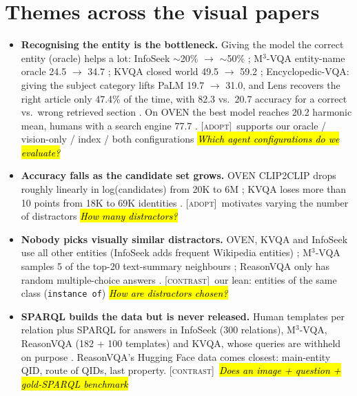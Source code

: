 \documentclass[10pt,a4paper]{article}
\newcommand{\adopt}{\textsc{[adopt]}}
\newcommand{\contrast}{\textsc{[contrast]}}
\newcommand{\q}[1]{\hl{\footnotesize\itshape #1}}
\begin{document}
\section{Themes across the visual papers}
\begin{itemize}
  \item \textbf{Recognising the entity is the bottleneck.} Giving the
    model the correct entity (oracle) helps a lot:
    InfoSeek $\sim$20\% $\to$ $\sim$50\% \cite[\S\,5.2, Table 5]{chen2023can};
    M$^3$-VQA entity-name oracle 24.5 $\to$ 34.7 \cite[\S\,5.3, Table
    4]{ma2026m3};
    KVQA closed world 49.5 $\to$ 59.2 \cite[Table 4]{shah2019kvqa};
    Encyclopedic-VQA: giving the subject category lifts PaLM 19.7
    $\to$ 31.0, and Lens recovers the right article only 47.4\% of
    the time, with 82.3 vs.\ 20.7 accuracy for a correct vs.\ wrong
    retrieved section \cite[\S\,5.2, \S\,5.4, Tables
    5--6]{mensink2023encyclopedic}.
    On OVEN the best model reaches 20.2 harmonic mean, humans with a
    search engine 77.7 \cite[\S\,5.2, Table 2]{hu2023open}.
    \adopt\ supports our oracle / vision-only / index / both
    configurations \q{Which agent configurations do we evaluate?}
  \item \textbf{Accuracy falls as the candidate set grows.} OVEN
    CLIP2CLIP drops roughly linearly in log(candidates) from 20K to
    6M \cite[\S\,6, Fig.~5]{hu2023open};
    KVQA loses more than 10 points from 18K to 69K identities
    \cite[\S\,Approach, Table 4]{shah2019kvqa}.
    \adopt\ motivates varying the number of distractors \q{How many
    distractors?}
  \item \textbf{Nobody picks visually similar distractors.} OVEN,
    KVQA and InfoSeek use all other entities (InfoSeek adds frequent
    Wikipedia entities) \cite[\S\,4]{chen2023can};
    M$^3$-VQA samples 5 of the top-20 text-summary neighbours
    \cite[App.~D.3]{ma2026m3}; ReasonVQA only has random
    multiple-choice answers \cite[\S\,3.2.2]{tran2025reasonvqa}.
    \contrast\ our lean: entities of the same class (\texttt{instance
    of}) \q{How are distractors chosen?}
  \item \textbf{SPARQL builds the data but is never released.} Human
    templates per relation plus SPARQL for answers in InfoSeek (300
    relations), M$^3$-VQA, ReasonVQA (182 + 100 templates) and KVQA,
    whose queries are withheld on purpose \cite[S3]{shah2019kvqa}.
    ReasonVQA's Hugging Face data comes closest: main-entity QID,
    route of QIDs, last property.
    \contrast\ \q{Does an image + question + gold-SPARQL benchmark
}
\end{itemize}
\end{document}
